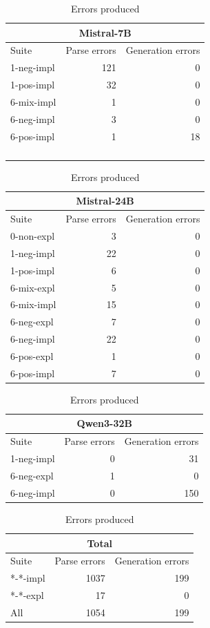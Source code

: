 \begin{table}
    \begin{tabular}{lrr}
    \toprule
    \multicolumn{3}{c}{\textbf{Mistral-7B}} \\
    \midrule
    Suite & Parse errors & Generation errors \\
    \midrule
    1-neg-impl & 121 & 0 \\
    1-pos-impl & 32 & 0 \\
    6-mix-impl & 1 & 0 \\
    6-neg-impl & 3 & 0 \\
    6-pos-impl & 1 & 18 \\
    & & \\
    & & \\
    & & \\
    & & \\
    \bottomrule
    \end{tabular}
    \quad
    \begin{tabular}{lrr}
    \toprule
    \multicolumn{3}{c}{\textbf{Mistral-24B}} \\
    \midrule
    Suite & Parse errors & Generation errors \\
    \midrule
    0-non-expl & 3 & 0 \\
    1-neg-impl & 22 & 0 \\
    1-pos-impl & 6 & 0 \\
    6-mix-expl & 5 & 0 \\
    6-mix-impl & 15 & 0 \\
    6-neg-expl & 7 & 0 \\
    6-neg-impl & 22 & 0 \\
    6-pos-expl & 1 & 0 \\
    6-pos-impl & 7 & 0 \\
    \bottomrule
    \end{tabular}
    
    \quad
    
    \begin{tabular}{lrr}
    \toprule
    \multicolumn{3}{c}{\textbf{Qwen3-32B}} \\
    \midrule
    Suite & Parse errors & Generation errors \\
    \midrule
    1-neg-impl & 0 & 31 \\
    6-neg-expl & 1 & 0 \\
    6-neg-impl & 0 & 150 \\
    \bottomrule
    \end{tabular}
    \quad
    \begin{tabular}{lrr}
    \toprule
    \multicolumn{3}{c}{\textbf{Total}} \\
    \midrule
    Suite & Parse errors & Generation errors \\
    \midrule
    *-*-impl & 1037 & 199 \\
    *-*-expl & 17 & 0 \\
    All & 1054 & 199 \\
    \bottomrule
    \end{tabular}
    
                
    \caption{Errors produced}
    \label{tab:err_table}
\end{table}